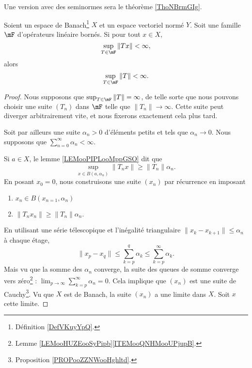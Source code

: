 Une version avec des seminormes sera le théorème \ref{ThoNBrmGIg}.
\begin{theorem}       \label{THOooJHVNooIDDxyT}
    Soient un espace de Banach\footnote{Définition \ref{DefVKuyYpQ}.} \( X\) et un espace vectoriel normé \( Y\). Soit une famille \( \mF\) d'opérateurs linéaire bornés. Si pour tout \( x\in  X\),
    \begin{equation}
        \sup_{T\in\mF}\| Tx \|<\infty,
    \end{equation}
    alors 
    \begin{equation}
        \sup_{T\in \mF}\| T \|<\infty.
    \end{equation}
\end{theorem}

\begin{proof}
    Nous supposons que \( \sup_{T\in\mF}\| T \|=\infty\), de telle sorte que nous pouvons choisir une suite \( (T_n)\) dans \( \mF\) telle que \( \| T_n \|\to \infty\). Cette suite peut diverger arbitrairement vite, et nous fixerons exactement cela plus tard.

    Soit par ailleurs une suite \( \alpha_n>0\) d'éléments petits et tels que \( \alpha_n\to 0\). Nous supposons que \( \sum_{n=0}^{\infty}\alpha_n<\infty\).

    Si \( a\in X\), le lemme \ref{LEMooPIPLooMppGSO} dit que
    \begin{equation}
        \sup_{x\in B(a,\alpha_n)}\| T_nx \|\geq \| T_n \|\alpha_n.
    \end{equation}
    En posant \( x_0=0\), nous construisons une suite \( (x_n)\) par récurrence en imposant
    \begin{enumerate}
        \item
            \( x_n\in B(x_{n=1}, \alpha_n)\)
        \item
            \( \| T_nx_n \|\geq \| T_n \|\alpha_n\).
    \end{enumerate}
    En utilisant une série télescopique et l'inégalité triangulaire \( \| x_k-x_{k+1} \|\leq \alpha_n\) à chaque étage,
    \begin{equation}
        \| x_p-x_q \|\leq \sum_{k=p}^q\alpha_k\leq \sum_{k=p}^{\infty}\alpha_k.
    \end{equation}
    Mais vu que la somme des \( \alpha_n\) converge, la suite des queues de somme converge vers zéro\footnote{Lemme \ref{LEMooHUZEooSyPipb}\ref{ITEMooQNHMooUPjupB}.} : \( \lim_{p\to \infty}\sum_{k=p}^{\infty}\alpha_n=0\). Cela implique que \( (x_n)\) est une suite de Cauchy\footnote{Proposition \ref{PROPooZZNWooHghltd}.}. Vu que \( X\) est de Banach, la suite \( (x_n)\) a une limite dans \( X\). Soit \( x\) cette limite.


\end{proof}
